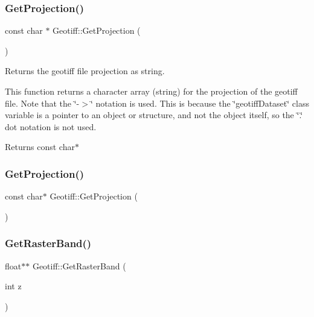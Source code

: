 \subsubsection{\texorpdfstring{Get\+Projection()}{GetProjection()}\hspace{0.1cm}{\footnotesize\ttfamily [1/2]}}
{\footnotesize\ttfamily const char $\ast$ Geotiff\+::\+Get\+Projection (\begin{DoxyParamCaption}{ }\end{DoxyParamCaption})}



Returns the geotiff file projection as string. 

This function returns a character array (string) for the projection of the geotiff file. Note that the \char`\"{}-\/$>$\char`\"{} notation is used. This is because the \char`\"{}geotiff\+Dataset\char`\"{} class variable is a pointer to an object or structure, and not the object itself, so the \char`\"{}.\char`\"{} dot notation is not used. \begin{DoxyReturn}{Returns}
const char$\ast$ 
\end{DoxyReturn}
\mbox{\label{class_geotiff_a70ce9a5c29a1fa3346cb4b66b60fe5e7}} 
\subsubsection{\texorpdfstring{Get\+Projection()}{GetProjection()}\hspace{0.1cm}{\footnotesize\ttfamily [2/2]}}
{\footnotesize\ttfamily const char$\ast$ Geotiff\+::\+Get\+Projection (\begin{DoxyParamCaption}{ }\end{DoxyParamCaption})}

\mbox{\label{class_geotiff_a23aa11fbd90ec46f75bc1355e6d1cbcc}} 
\subsubsection{\texorpdfstring{Get\+Raster\+Band()}{GetRasterBand()}\hspace{0.1cm}{\footnotesize\ttfamily [1/2]}}
{\footnotesize\ttfamily float$\ast$$\ast$ Geotiff\+::\+Get\+Raster\+Band (\begin{DoxyParamCaption}\item[{int}]{z }\end{DoxyParamCaption})}


